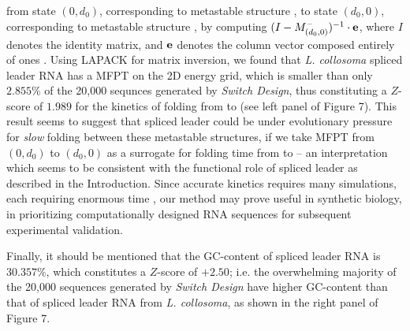 from state $(0,d_0)$, corresponding to metastable structure \strA,
 to state $(d_0,0)$, corresponding to metastable structure \strB,  by
computing $(I - M^{-}_{(d_0,0)})^{-1} \cdot {\bf e}$, where
$I$ denotes the identity matrix, and ${\bf e}$ denotes the column vector
composed entirely of ones \cite{meyerMFPT}. Using LAPACK \cite{LAPACK}
for matrix inversion, we found that
{\em L. collosoma} spliced leader RNA has a
MFPT on the 2D energy grid, which is smaller than only $2.855\%$ of the
20,000 sequnces generated by {\em Switch Design}, thus constituting a
$Z$-score of $1.989$ for the kinetics of folding from \strA to \strB
(see left panel of Figure 7).
This result seems to suggest that spliced leader could be
under evolutionary pressure for {\em slow} folding between these
metastable structures, if we take
MFPT from $(0,d_0)$ to $(d_0,0)$ as a surrogate for \kinfold \cite{flamm}
folding time from \strA to \strB -- an interpretation which seems to be
consistent with the functional role of spliced leader as described
in the Introduction.
Since accurate \kinfold kinetics requires many simulations,
each requiring enormous time \cite{wolfingerStadler:kinetics},
our method may prove useful in synthetic biology, in prioritizing
computationally designed RNA sequences for subsequent
experimental validation.

Finally, it should be mentioned that the GC-content of spliced leader
RNA is
$30.357\%$, which constitutes a $Z$-score of
$+2.50$; i.e. the overwhelming majority of the 20,000 sequences generated
by {\em Switch Design} have higher GC-content than that of spliced leader
RNA from {\em L. collosoma}, as shown in the right panel of
Figure 7.

